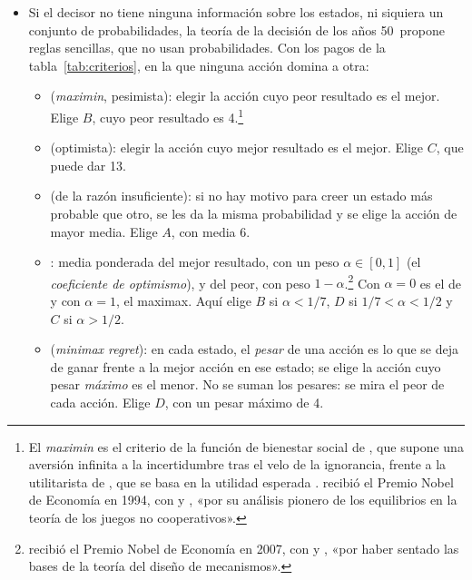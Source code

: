 \documentclass[11pt]{article}
\begin{document}
\begin{itemize}
\item Si el decisor no tiene ninguna información sobre los estados, ni siquiera un conjunto de probabilidades, la teoría de la decisión de los años 50~propone reglas sencillas, que no usan probabilidades\nocite{LuceRaiffa1957Games}. Con los pagos de la tabla~\ref{tab:criterios}, en la que ninguna acción domina a otra:
  \begin{itemize}
  \item {} (\emph{maximin}, pesimista)\nocite{Wald1950Statistical}: elegir la acción cuyo peor resultado es el mejor. Elige $B$, cuyo peor resultado es 4.\footnote{El \emph{maximin} es el criterio de la función de bienestar social de , que supone una aversión infinita a la incertidumbre tras el velo de la ignorancia, frente a la utilitarista de , que se basa en la utilidad esperada .  recibió el Premio Nobel de Economía en 1994, con  y , «por su análisis pionero de los equilibrios en la teoría de los juegos no cooperativos»\nocite{Nobel1994Nash}.}
  \item {} (optimista): elegir la acción cuyo mejor resultado es el mejor. Elige $C$, que puede dar 13.
  \item {} (de la razón insuficiente): si no hay motivo para creer un estado más probable que otro, se les da la misma probabilidad y se elige la acción de mayor media. Elige $A$, con media 6.
  \item {}: media ponderada del mejor resultado, con un peso $\alpha\in[0,1]$ (el \emph{coeficiente de optimismo}), y del peor, con peso $1-\alpha$\nocite{ArrowHurwicz1972Optimality}.\footnote{ recibió el Premio Nobel de Economía en 2007, con  y , «por haber sentado las bases de la teoría del diseño de mecanismos»\nocite{Nobel2007HurwiczMaskinMyerson}.} Con $\alpha=0$ es el de  y con $\alpha=1$, el maximax. Aquí elige $B$ si $\alpha<1/7$, $D$ si $1/7<\alpha<1/2$ y $C$ si $\alpha>1/2$.
  \item {} (\emph{minimax regret})\nocite{Savage1951Theory}: en cada estado, el \emph{pesar} de una acción es lo que se deja de ganar frente a la mejor acción en ese estado; se elige la acción cuyo pesar \emph{máximo} es el menor. No se suman los pesares: se mira el peor de cada acción. Elige $D$, con un pesar máximo de 4.
  \end{itemize}
\end{itemize}
\end{document}
